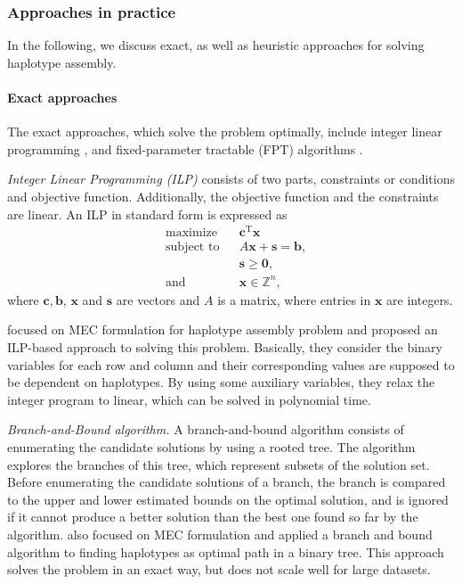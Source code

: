 \subsubsection{Approaches in practice}
In the following, we discuss exact, as well as heuristic approaches for solving haplotype assembly.
\paragraph{Exact approaches} The exact approaches, which solve the problem optimally, include integer linear programming \citep{Fouilhoux2012,CDW13_exact}, and fixed-parameter tractable (FPT) algorithms \citep{he2010optimal,Patterson2015,Pirola2015}.

\textit{Integer Linear Programming (ILP)} consists of two parts, constraints or conditions and objective function. Additionally, the objective function and the constraints are linear.
An ILP in standard form is expressed as
\[{\begin{aligned}&{\text{maximize}}&&\mathbf {c} ^{\mathrm {T} }\mathbf {x} \\&{\text{subject to}}&&A\mathbf {x} +\mathbf {s} =\mathbf {b} ,\\&&&\mathbf {s} \geq \mathbf {0} ,\\&{\text{and}}&&\mathbf {x} \in \mathbb {Z} ^{n},\end{aligned}}\]
where $\displaystyle \mathbf {c} ,\mathbf {b} $, $\mathbf {x}$ and $\mathbf {s}$ are vectors and $\displaystyle A $ is a matrix, where entries in $\mathbf {x}$ are integers.

\cite{CDW13_exact} focused on MEC formulation for haplotype assembly problem and proposed an ILP-based approach to solving this problem.
Basically, they consider the binary variables for each row and column and their corresponding values are supposed to be dependent on haplotypes.
By using some auxiliary variables, they relax the integer program to linear, which can be solved in polynomial time.

\textit{Branch-and-Bound algorithm.}
A branch-and-bound algorithm consists of enumerating the candidate solutions by using a rooted tree.
The algorithm explores the branches of this tree, which represent subsets of the solution set.
Before enumerating the candidate solutions of a branch, the branch is compared to the upper and lower estimated bounds on the optimal solution, and is ignored if it cannot produce a better solution than the best one found so far by the algorithm.
\cite{wang2005haplotype} also focused on MEC formulation and applied a branch
and bound algorithm to finding haplotypes as optimal path in a binary tree. This approach solves the problem in an exact way, but does not scale well for large datasets.

